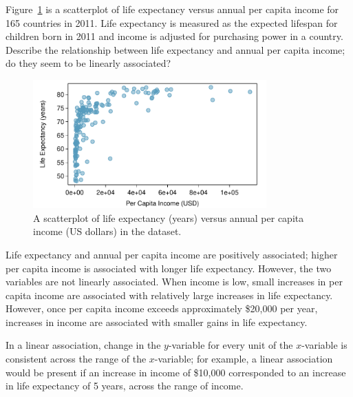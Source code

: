 \begin{example}{Figure~\ref{incomeLifeExpectancy} is a scatterplot of life expectancy versus annual per capita income for 165 countries in 2011. Life expectancy is measured as the expected lifespan for children born in 2011 and income is adjusted for purchasing power in a country. Describe the relationship between life expectancy and annual per capita income; do they seem to be linearly associated?
		
		\begin{figure}[h]
			\centering
			\includegraphics[width=0.8\textwidth]
			{ch_intro_to_data_oi_biostat/figures/wdiIncomeLifeExpectancy/wdiIncomeLifeExpectancy.pdf}
			\caption{A scatterplot of life expectancy (years) versus annual per capita income (US dollars) in the  dataset.}
			\label{incomeLifeExpectancy}
		\end{figure}
		
		}

Life expectancy and annual per capita income are positively associated; higher per capita income is associated with longer life expectancy. However, the two variables are not linearly associated. When income is low, small increases in per capita income are associated with relatively large increases in life expectancy. However, once per capita income exceeds approximately \$20,000 per year, increases in income are associated with smaller gains in life expectancy. 

In a linear association, change in the $y$-variable for every unit of the $x$-variable is consistent across the range of the $x$-variable; for example, a linear association would be present if an increase in income of \$10,000 corresponded to an increase in life expectancy of 5 years, across the range of income. 	
	
\end{example}



